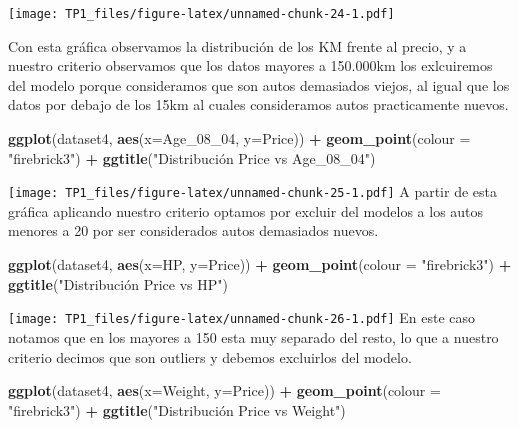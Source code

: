 \documentclass[
]{article}
\newenvironment{Shaded}{\begin{snugshade}}{\end{snugshade}}
\newcommand{\DataTypeTok}[1]{\textcolor[rgb]{0.13,0.29,0.53}{#1}}
\newcommand{\DecValTok}[1]{\textcolor[rgb]{0.00,0.00,0.81}{#1}}
\newcommand{\KeywordTok}[1]{\textcolor[rgb]{0.13,0.29,0.53}{\textbf{#1}}}
\newcommand{\NormalTok}[1]{#1}
\newcommand{\OperatorTok}[1]{\textcolor[rgb]{0.81,0.36,0.00}{\textbf{#1}}}
\newcommand{\StringTok}[1]{\textcolor[rgb]{0.31,0.60,0.02}{#1}}
\begin{document}
\texttt{[image: TP1\_files/figure-latex/unnamed-chunk-24-1.pdf]}

Con esta gráfica observamos la distribución de los KM frente al precio,
y a nuestro criterio observamos que los datos mayores a 150.000km los
exlcuiremos del modelo porque consideramos que son autos demasiados
viejos, al igual que los datos por debajo de los 15km al cuales
consideramos autos practicamente nuevos.

\begin{Shaded}
\begin{Highlighting}[]
\KeywordTok{ggplot}\NormalTok{(dataset4, }\KeywordTok{aes}\NormalTok{(}\DataTypeTok{x=}\NormalTok{Age_}\DecValTok{08}\NormalTok{_}\DecValTok{04}\NormalTok{, }\DataTypeTok{y=}\NormalTok{Price)) }\OperatorTok{+}\StringTok{ }\KeywordTok{geom_point}\NormalTok{(}\DataTypeTok{colour =} \StringTok{"firebrick3"}\NormalTok{) }\OperatorTok{+}\StringTok{ }
\StringTok{          }\KeywordTok{ggtitle}\NormalTok{(}\StringTok{"Distribución Price vs Age_08_04"}\NormalTok{)}
\end{Highlighting}
\end{Shaded}

\texttt{[image: TP1\_files/figure-latex/unnamed-chunk-25-1.pdf]} A partir
de esta gráfica aplicando nuestro criterio optamos por excluir del
modelos a los autos menores a 20 por ser considerados autos demasiados
nuevos.

\begin{Shaded}
\begin{Highlighting}[]
\KeywordTok{ggplot}\NormalTok{(dataset4, }\KeywordTok{aes}\NormalTok{(}\DataTypeTok{x=}\NormalTok{HP, }\DataTypeTok{y=}\NormalTok{Price)) }\OperatorTok{+}\StringTok{ }\KeywordTok{geom_point}\NormalTok{(}\DataTypeTok{colour =} \StringTok{"firebrick3"}\NormalTok{) }\OperatorTok{+}\StringTok{ }
\StringTok{        }\KeywordTok{ggtitle}\NormalTok{(}\StringTok{"Distribución Price vs HP"}\NormalTok{)}
\end{Highlighting}
\end{Shaded}

\texttt{[image: TP1\_files/figure-latex/unnamed-chunk-26-1.pdf]} En este
caso notamos que en los mayores a 150 esta muy separado del resto, lo
que a nuestro criterio decimos que son outliers y debemos excluirlos del
modelo.

\begin{Shaded}
\begin{Highlighting}[]
\KeywordTok{ggplot}\NormalTok{(dataset4, }\KeywordTok{aes}\NormalTok{(}\DataTypeTok{x=}\NormalTok{Weight, }\DataTypeTok{y=}\NormalTok{Price)) }\OperatorTok{+}\StringTok{ }\KeywordTok{geom_point}\NormalTok{(}\DataTypeTok{colour =} \StringTok{"firebrick3"}\NormalTok{) }\OperatorTok{+}
\StringTok{        }\KeywordTok{ggtitle}\NormalTok{(}\StringTok{"Distribución Price vs Weight"}\NormalTok{)}
\end{Highlighting}
\end{Shaded}
\end{document}

